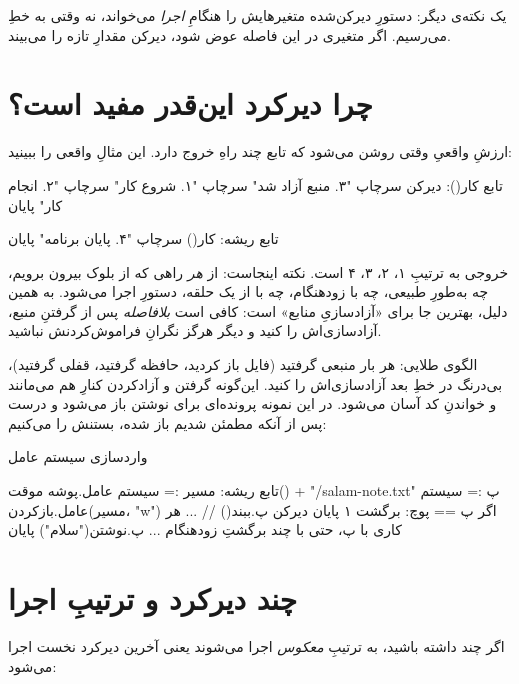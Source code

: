 یک نکته‌ی دیگر: دستورِ دیرکن‌شده متغیرهایش را هنگامِ \emph{اجرا} می‌خواند، نه
وقتی به خطِ  می‌رسیم. اگر متغیری در این فاصله عوض شود، دیرکن مقدارِ
تازه را می‌بیند.

\section{چرا دیرکرد این‌قدر مفید است؟}

ارزشِ واقعیِ  وقتی روشن می‌شود که تابع چند راهِ خروج دارد. این مثالِ
واقعی را ببینید:

\begin{salamfa}
تابع کار():
    دیرکن سرچاپ "۳. منبع آزاد شد"
    سرچاپ "۱. شروع کار"
    سرچاپ "۲. انجام کار"
پایان

تابع ریشه:
    کار()
    سرچاپ "۴. پایان برنامه"
پایان
\end{salamfa}

خروجی به ترتیبِ ۱، ۲، ۳، ۴ است. نکته اینجاست: از \emph{هر} راهی که از بلوک
بیرون برویم، چه به‌طورِ طبیعی، چه با  زودهنگام، چه با  از
یک حلقه، دستورِ  اجرا می‌شود. به همین دلیل،  بهترین جا برای «آزادسازیِ
منابع» است: کافی است \emph{بلافاصله} پس از گرفتنِ منبع، آزادسازی‌اش را
 کنید و دیگر هرگز نگرانِ فراموش‌کردنش نباشید.

\begin{tip}
الگوی طلایی: هر بار منبعی گرفتید (فایل باز کردید، حافظه گرفتید، قفلی گرفتید)،
بی‌درنگ در خطِ بعد آزادسازی‌اش را  کنید. این‌گونه گرفتن و آزادکردن
کنارِ هم می‌مانند و خواندنِ کد آسان می‌شود. در این نمونه پرونده‌ای برای
نوشتن باز می‌شود و درست پس از آنکه مطمئن شدیم باز شده، بستنش را
 می‌کنیم:
\begin{salamfa}
واردسازی سیستم عامل

تابع ریشه:
    مسیر := سیستم عامل.پوشه موقت() + "/salam-note.txt"
    پ := سیستم عامل.بازکردن(مسیر، "w")
    اگر پ == پوچ:
        برگشت ۱
    پایان
    دیرکن پ.ببند()
    // ... هر کاری با پ، حتی با چند برگشتِ زودهنگام ...
    پ.نوشتن("سلام\n")
پایان
\end{salamfa}
\end{tip}

\section{چند دیرکرد و ترتیبِ اجرا}

اگر چند  داشته باشید، به ترتیبِ \emph{معکوس} اجرا می‌شوند یعنی
آخرین دیرکرد نخست اجرا می‌شود:

